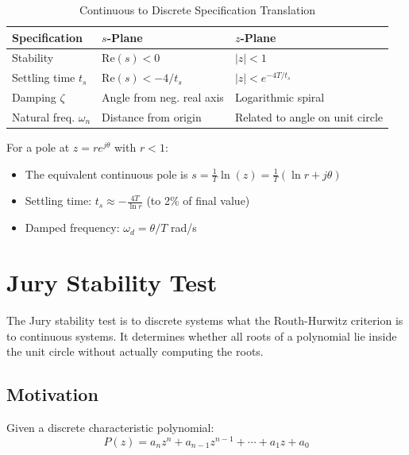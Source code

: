 \begin{table}[htbp]
\centering
\caption{Continuous to Discrete Specification Translation}
\label{tab:spec_translation}
\begin{tabular}{lll}
\toprule
\textbf{Specification} & \textbf{$s$-Plane} & \textbf{$z$-Plane} \\
\midrule
Stability & $\text{Re}(s) < 0$ & $|z| < 1$ \\[0.3em]
Settling time $t_s$ & $\text{Re}(s) < -4/t_s$ & $|z| < e^{-4T/t_s}$ \\[0.3em]
Damping $\zeta$ & Angle from neg. real axis & Logarithmic spiral \\[0.3em]
Natural freq. $\omega_n$ & Distance from origin & Related to angle on unit circle \\
\bottomrule
\end{tabular}
\end{table}

For a pole at $z = re^{j\theta}$ with $r < 1$:
\begin{itemize}
    \item The equivalent continuous pole is $s = \frac{1}{T}\ln(z) = \frac{1}{T}(\ln r + j\theta)$
    \item Settling time: $t_s \approx -\frac{4T}{\ln r}$ (to 2\% of final value)
    \item Damped frequency: $\omega_d = \theta/T$ rad/s
\end{itemize}

\section{Jury Stability Test}
\label{sec:jury_test}

The Jury stability test is to discrete systems what the Routh-Hurwitz criterion is to continuous systems. It determines whether all roots of a polynomial lie inside the unit circle without actually computing the roots.

\subsection{Motivation}

Given a discrete characteristic polynomial:
\begin{equation}
P(z) = a_n z^n + a_{n-1} z^{n-1} + \cdots + a_1 z + a_0
\label{eq:char_poly}
\end{equation}

